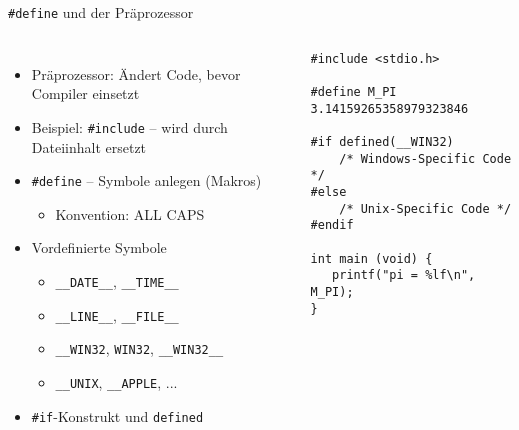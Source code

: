
\begin{frame}[t,plain]
\titlepage
\end{frame}


\begin{frame}[fragile]{\texttt{\#define} und der Präprozessor}
%
\begin{columns}[T]
\begin{itemize}
\item Präprozessor: Ändert Code, bevor Compiler einsetzt
\item Beispiel: \texttt{#include} -- wird durch Dateiinhalt ersetzt
\item \texttt{#define} -- Symbole anlegen (Makros)
	\begin{itemize}
	\item Konvention: ALL CAPS
	\end{itemize}
\item Vordefinierte Symbole
	\begin{itemize}
	\item \texttt{\_\_DATE\_\_}, \texttt{\_\_TIME\_\_}
	\item \texttt{\_\_LINE\_\_}, \texttt{\_\_FILE\_\_}
	\item \texttt{\_\_WIN32}, \texttt{WIN32}, \texttt{\_\_WIN32\_\_}
	\item \texttt{\_\_UNIX}, \texttt{\_\_APPLE}, ...
	\end{itemize}
\item \texttt{#if}-Konstrukt und \texttt{defined} 
\end{itemize}
%
\begin{codebox}
\begin{verbatim}
#include <stdio.h>

#define M_PI 3.14159265358979323846

#if defined(__WIN32)
    /* Windows-Specific Code */
#else
    /* Unix-Specific Code */
#endif

int main (void) {
   printf("pi = %lf\n", M_PI);
}
\end{verbatim}
\end{codebox}
\end{columns}
%
\end{frame}

